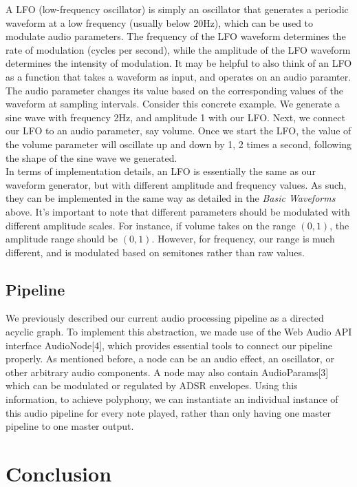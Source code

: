 \documentclass[a4paper, 12pt]{article}
\begin{document}
A LFO (low-frequency oscillator) is simply an oscillator that generates a periodic waveform at a low frequency (usually below 20Hz), which can be used to modulate audio parameters. The frequency of the LFO waveform determines the rate of modulation (cycles per second), while the amplitude of the LFO waveform determines the intensity of modulation. It may be helpful to also think of an LFO as a function that takes a waveform as input, and operates on an audio paramter. The audio parameter changes its value based on the corresponding values of the waveform at sampling intervals. Consider this concrete example. We generate a sine wave with frequency 2Hz, and amplitude 1 with our LFO. Next, we connect our LFO to an audio parameter, say volume. Once we start the LFO, the value of the volume parameter will oscillate up and down by 1, 2 times a second, following the shape of the sine wave we generated.\\

In terms of implementation details, an LFO is essentially the same as our waveform generator, but with different amplitude and frequency values. As such, they can be implemented in the same way as detailed in the \emph{Basic Waveforms} above. It's important to note that different parameters should be modulated with different amplitude scales. For instance, if volume takes on the range $(0, 1)$, the amplitude range should be $(0, 1)$. However, for frequency, our range is much different, and is modulated based on semitones rather than raw values.

\subsection*{Pipeline}

We previously described our current audio processing pipeline as a directed acyclic graph. To implement this abstraction, we made use of the Web Audio API interface AudioNode[4], which provides essential tools to connect our pipeline properly. As mentioned before, a node can be an audio effect, an oscillator, or other arbitrary audio components. A node may also contain AudioParams[3] which can be modulated or regulated by ADSR envelopes. Using this information, to achieve polyphony, we can instantiate an individual instance of this audio pipeline for every note played, rather than only having one master pipeline to one master output.

\section*{Conclusion}
\end{document}
